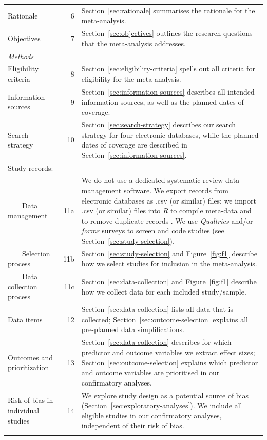 \documentclass[10pt, a4paper]{article}
\begin{document}
\begin{tabularx}{\linewidth}{lrX}
Rationale & 6 & Section~\ref{sec:rationale} summarises the rationale for the meta-analysis. \\ \addlinespace
Objectives & 7 & Section~\ref{sec:objectives} outlines the research questions that the meta-analysis addresses. \\ \addlinespace \midrule \addlinespace
\textit{Methods} & & \\ \addlinespace 
Eligibility criteria & 8 & Section~\ref{sec:eligibility-criteria} spells out all criteria for eligibility for the meta-analysis. \\ \addlinespace 
Information sources & 9 & Section~\ref{sec:information-sources} describes all intended information sources, as well as the planned dates of coverage. \\ \addlinespace 
Search strategy & 10 & Section~\ref{sec:search-strategy} describes our search strategy for four electronic databases, while the planned dates of coverage are described in Section~\ref{sec:information-sources}. \\ \addlinespace
Study records: & & \\
~~~~Data management & 11a & We do not use a dedicated systematic review data management software. We export records from electronic databases as .csv (or similar) files; we import .csv (or similar) files into \emph{R} to compile meta-data and to remove duplicate records \cite{revtools_package}. We use \emph{Qualtrics} and/or \emph{formr} \cite{arslan_formr_2018} surveys to screen and code studies (see Section~\ref{sec:study-selection}). \\
~~~~Selection process & 11b & Section~\ref{sec:study-selection} and Figure~\ref{fig:f1} describe how we select studies for inclusion in the meta-analysis. \\
~~~~Data collection process & 11c & Section~\ref{sec:data-collection} and Figure~\ref{fig:f1} describe how we collect data for each included study/sample. \\ \addlinespace
Data items & 12 & Section~\ref{sec:data-collection} lists all data that is collected; Section~\ref{sec:outcome-selection} explains all pre-planned data simplifications.\\ \addlinespace
Outcomes and prioritization & 13 & Section~\ref{sec:data-collection} describes for which predictor and outcome variables we extract effect sizes; Section~\ref{sec:outcome-selection} explains which predictor and outcome variables are prioritised in our confirmatory analyses.\\ \addlinespace
Risk of bias in individual studies & 14 & We explore study design as a potential source of bias (Section~\ref{sec:exploratory-analyses}). We include all eligible studies in our confirmatory analyses, independent of their risk of bias.\\\addlinespace

\end{tabularx}
\end{document}
